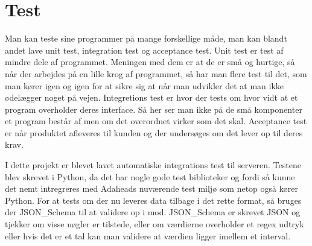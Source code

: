 \chapter{Test}
Man kan teste sine programmer på mange forskellige måde, man kan blandt andet lave unit test, integration test og acceptance test. Unit test er test af mindre dele af programmet. Meningen med dem er at de er små og hurtige, så når der arbejdes på en lille krog af programmet, så har man flere test til det, som man kører igen og igen for at sikre sig at når man udvikler det at man ikke ødelægger noget på vejen.
Integretions test er hvor der tests om hvor vidt at et program overholder deres interface. Så her ser man ikke på de små komponenter et program består af men om det overordnet virker som det skal.
Acceptance test er når produktet afleveres til kunden og der undersøges om det lever op til deres krav.

I dette projekt er blevet lavet automatiske integrations test til serveren. Testene blev skrevet i Python, da det har nogle gode test biblioteker og fordi så kunne det nemt intregreres med Adaheads nuværende test miljø som netop også kører Python.
For at tests om der nu leveres data tilbage i det rette format, så bruges der JSON\_Schema til at validere op i mod. JSON\_Schema er skrevet JSON og tjekker om visse nøgler er tilstede, eller om værdierne overholder et regex udtryk eller hvis det er et tal kan man validere at værdien ligger imellem et interval.
